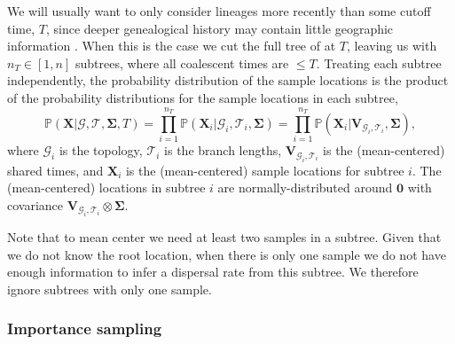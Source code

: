 \documentclass[12pt]{article}
\begin{document}
We will usually want to only consider lineages more recently than some cutoff time, $T$, since deeper genealogical history may contain little geographic information \citep{wilkins2004separation}.
When this is the case we cut the full tree of at $T$, leaving us with $n_T \in [1, n ] $ subtrees, where all coalescent times are $\leq T$.
Treating each subtree independently, the probability distribution of the sample locations is the product of the probability distributions for the sample locations in each subtree, 
$$
\mathbb{P}(\mathbf{X} | \mathcal{G}, \mathcal{T}, \mathbf{\Sigma}, T) = \prod_{i=1}^{n_T} \mathbb{P}(\mathbf{X}_i | \mathcal{G}_i, \mathcal{T}_i, \mathbf{\Sigma}) = \prod_{i=1}^{n_T} \mathbb{P}(\mathbf{X}_i | \mathbf{V}_{\mathcal{G}_i, \mathcal{T}_i}, \mathbf{\Sigma}),
$$
where $\mathcal{G}_i$ is the topology, $\mathcal{T}_i$ is the branch lengths, $\mathbf{V}_{\mathcal{G}_i, \mathcal{T}_i}$ is the (mean-centered) shared times, and $\mathbf{X}_i$ is the (mean-centered) sample locations for subtree $i$.
The (mean-centered) locations in subtree $i$ are normally-distributed
%
around $\mathbf{0}$ with covariance $\mathbf{V}_{\mathcal{G}_i,\mathcal{T}_i} \otimes \mathbf{\Sigma}$.

Note that to mean center we need at least two samples in a subtree. Given that we do not know the root location, when there is only one sample we do not have enough information to infer a dispersal rate from this subtree. We therefore ignore subtrees with only one sample.

\subsubsection*{Importance sampling}
\end{document}

